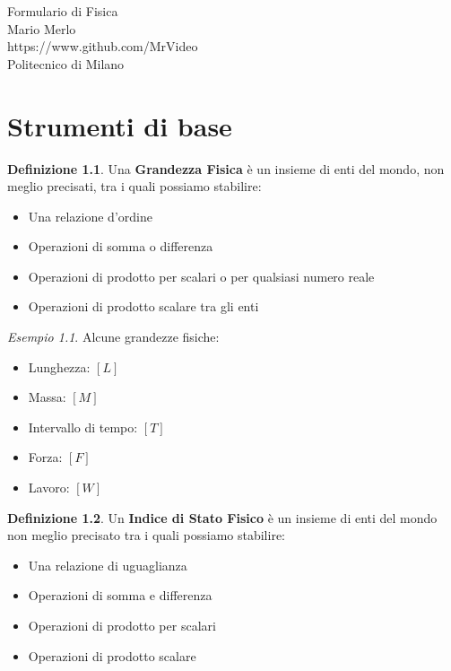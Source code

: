\documentclass[a4paper, 12pt]{report}
\theoremstyle{definition}
\newtheorem{definition}{Definizione}[chapter]
\theoremstyle{remark}
\newtheorem{example}{Esempio}[definition]
\theoremstyle{plain}
\begin{document}
\begin{titlepage}
    \begin{center}
        \vspace*{5cm}
        \Huge{Formulario di Fisica}\\[1cm]
        \Large{Mario Merlo}\\
        \Large{https://www.github.com/MrVideo}\\
        \Large{Politecnico di Milano}\\[7,5cm]
    \end{center}
    \doclicenseThis
\end{titlepage}

\chapter{Strumenti di base}

\begin{definition}
    Una {\bf Grandezza Fisica} è un insieme di enti del mondo, non meglio precisati, tra i quali possiamo stabilire:
    \begin{itemize}
        \item Una relazione d'ordine
        \item Operazioni di somma o differenza
        \item Operazioni di prodotto per scalari o per qualsiasi numero reale
        \item Operazioni di prodotto scalare tra gli enti
    \end{itemize}
\end{definition}

\begin{example}
    Alcune grandezze fisiche:
    \begin{itemize}
        \item Lunghezza: $[L]$
        \item Massa: $[M]$
        \item Intervallo di tempo: $[T]$
        \item Forza: $[F]$
        \item Lavoro: $[W]$
    \end{itemize}
\end{example}

\begin{definition}
    Un {\bf Indice di Stato Fisico} è un insieme di enti del mondo non meglio precisato tra i quali possiamo stabilire:
    \begin{itemize}
        \item Una relazione di uguaglianza
        \item Operazioni di somma e differenza
        \item Operazioni di prodotto per scalari
        \item Operazioni di prodotto scalare
    \end{itemize}
\end{definition}
\end{document}
